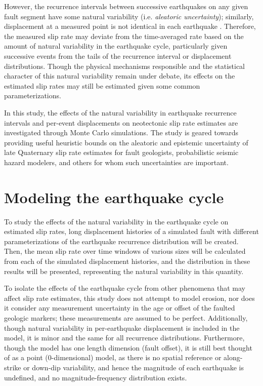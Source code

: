\documentclass[se, manuscript]{copernicus}
\begin{document}
However, the recurrence intervals between successive earthquakes on any
given fault segment have some natural variability (i.e. \emph{aleatoric
uncertainty}); similarly, displacement at a measured point is not
identical in each earthquake \citep[e.g.]{duross_holocene_2008}.
Therefore, the measured slip rate may deviate from the time-averaged
rate based on the amount of natural variability in the earthquake cycle,
particularly given successive events from the tails of the recurrence
interval or displacement distributions. Though the physical mechanisms
responsible and the statistical character of this natural variability
remain under debate, its effects on the estimated slip rates may still
be estimated given some common parameterizations.

In this study, the effects of the natural variability in earthquake
recurrence intervals and per-event displacements on neotectonic slip
rate estimates are investigated through Monte Carlo simulations. The
study is geared towards providing useful heuristic bounds on the
aleatoric and epistemic uncertainty of late Quaternary slip rate
estimates for fault geologists, probabilistic seismic hazard modelers,
and others for whom such uncertainties are important.


\section{Modeling the earthquake
cycle}\label{modeling-the-earthquake-cycle}

To study the effects of the natural variability in the earthquake cycle
on estimated slip rates, long displacement histories of a simulated
fault with different parameterizations of the earthquake recurrence
distribution will be created. Then, the mean slip rate over time windows
of various sizes will be calculated from each of the simulated
displacement histories, and the distribution in these results will be
presented, representing the natural variability in this quantity.

To isolate the effects of the earthquake cycle from other phenomena that
may affect slip rate estimates, this study does not attempt to model
erosion, nor does it consider any measurement uncertainty in the age or
offset of the faulted geologic markers; these measurements are assumed
to be perfect. Additionally, though natural variability in
per-earthquake displacement is included in the model, it is minor and
the same for all recurrence distributions. Furthermore, though the model
has one length dimension (fault offset), it is still best thought of as
a point (0-dimensional) model, as there is no spatial reference or
along-strike or down-dip variability, and hence the magnitude of each
earthquake is undefined, and no magnitude-frequency distribution exists.
\end{document}
